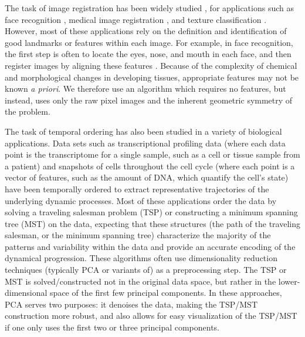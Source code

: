 \documentclass{pnastwo}
\begin{document}
\begin{article}
The task of image registration has been widely studied \cite{zitova2003image}, for applications such as face recognition \cite{rowley1998rotation}, medical image registration \cite{hajnal2010medical}, and texture classification \cite{greenspan1994rotation}.
%
However, most of these applications rely on the definition and identification of good landmarks or features within each image. 
%
For example, in face recognition, the first step is often to locate the eyes, nose, and mouth in each face, and then register images by aligning these features \cite{zhao2003face}.
%
%
Because of the complexity of chemical and morphological changes in developing tissues, appropriate features may not be known {\it a priori}.
%
We therefore use an algorithm which requires no features, but instead, uses only the raw pixel images and the inherent geometric symmetry of the problem.
%
%
%

The task of temporal ordering has also been studied in a variety of biological applications. 
%
Data sets such as transcriptional profiling data (where each data point is the transcriptome for a single sample, such as a cell or tissue sample from a patient) \cite{anavy2014blind, trapnell2014dynamics,gupta2008extracting, qiu2011discovering} and snapshots of cells throughout the cell cycle (where each point is a vector of features, such as the amount of DNA, which quantify the cell's state)  \cite{kafri2013dynamics} have been temporally ordered to extract representative trajectories of the underlying dynamic processes.
%
Most of these applications order the data by solving a traveling salesman problem (TSP) or constructing a minimum spanning tree (MST) on the data,
expecting that these structures (the path of the traveling salesman, or the minimum spanning tree) characterize the majority of the patterns and variability within the data and provide an accurate encoding of the dynamical progression.
%
These algorithms often use dimensionality reduction techniques (typically PCA or variants of) as a preprocessing step.
%
The TSP or MST is solved/constructed not in the original data space, but rather in the lower-dimensional space of the first few principal components.
%
In these approaches, PCA serves two purposes: it denoises the data, making the TSP/MST construction more robust, and also allows for easy visualization of the TSP/MST if one only uses the first two or three principal components.


\end{article}
\end{document}

